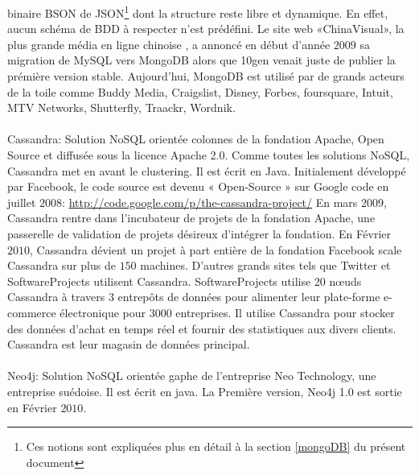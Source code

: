 binaire \textsf{BSON} de \textsf{JSON}\footnote{Ces notions sont
expliquées plus en détail à la section \ref{mongoDB} du présent
document} dont la structure reste libre et dynamique.  En effet, aucun
schéma de \textsf{BDD} à respecter n'est prédéfini\cite{mongoDB}. Le
site web «\textsf{ChinaVisual}», la plus grande média en ligne
chinoise
,
a annoncé en début d'année $2009$ sa migration de \textsf{MySQL}
vers \textsf{MongoDB}\cite{GUYunhua} alors que \textsf{10gen} venait juste de publier la prémière version stable. Aujourd'hui, \textsf{MongoDB} est utilisé par de grands acteurs de la toile comme \textsf{Buddy Media, Craigslist, Disney, Forbes, foursquare, Intuit, MTV Networks, Shutterfly, Traackr, Wordnik}\cite{10genClients}.
\\
\\ 
\textsf{Cassandra}:  Solution \textsf{NoSQL} orientée 
\textsf{colonnes} de la fondation \textsf{Apache}, Open Source et diffusée sous la licence
 Apache 2.0. Comme toutes les solutions \textsf{NoSQL}, \textsf{Cassandra} 
met en avant le clustering. Il est écrit en 
\textsf{Java}\cite{RickCattell}. Initialement développé par 
\textsf{Facebook}, le code source est devenu « \textsf{Open-Source} » sur 
\textsf{Google code} en juillet $2008$: 
\url{http://code.google.com/p/the-cassandra-project/}
En
mars $2009$, \textsf{Cassandra} rentre dans l'incubateur de projets
de la fondation \textsf{Apache}, une passerelle de
validation de projets désireux d'intégrer la fondation. En Février
$2010$, \textsf{Cassandra} dévient un projet à part entière de la
fondation
\textsf{Facebook}
scale \textsf{Cassandra} sur plus de $150$ machines. D'autres grands
sites tels que \textsf{Twitter et SoftwareProjects}
utilisent \textsf{Cassandra}. \textsf{SoftwareProjects} utilise 20
nœuds \textsf{Cassandra} à travers 3 entrepôts de données pour
alimenter leur plate-forme e-commerce électronique pour $3000$
entreprises. Il utilise \textsf{Cassandra} pour stocker des données
d'achat en temps réel et fournir des statistiques aux divers
clients. \textsf{Cassandra} est leur magasin de données
principal\cite{apacheClients}.
\\
\\
\textsf{Neo4j}:  Solution \textsf{NoSQL} orientée 
\textsf{gaphe} de l'entreprise \textsf{Neo Technology}, une entreprise suédoise\cite{MichaelFiguiereNeo4j}. Il est écrit en java\cite{GavinTerrill}. La Première version, \textsf{Neo4j 1.0} est sortie en Février $2010$\cite{Neo4jBlog}. 
